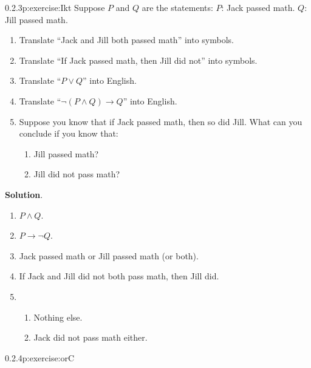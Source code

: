\documentclass[twoside,11pt,]{book}
\newcommand{\blocktitlefont}{\relax}
\numberwithin{equation}{chapter}
\newcommand{\imp}{\rightarrow}
\begin{document}
\begin{divisionsolution}{0.2.3}{}{p:exercise:Ikt}%
Suppose \(P\) and \(Q\) are the statements: \(P\): Jack passed math. \(Q\): Jill passed math.%
\begin{enumerate}[label=(\alph*)]
\item{}Translate ``Jack and Jill both passed math'' into symbols.%
\item{}Translate ``If Jack passed math, then Jill did not'' into symbols.%
\item{}Translate ``\(P \vee Q\)'' into English.%
\item{}Translate ``\(\neg(P \wedge Q) \imp Q\)'' into English.%
\item{}Suppose you know that if Jack passed math, then so did Jill. What can you conclude if you know that:%
\begin{enumerate}[label=\roman*.]
\item{}Jill passed math?%
\item{}Jill did not pass math?%
\end{enumerate}
%
\end{enumerate}
%
\par\smallskip%
\noindent\textbf{\blocktitlefont Solution}.\quad{}%
\begin{enumerate}[label=(\alph*)]
\item{}\(P \wedge Q\).%
\item{}\(P \imp \neg Q\).%
\item{}Jack passed math or Jill passed math (or both).%
\item{}If Jack and Jill did not both pass math, then Jill did.%
\item{}%
\begin{enumerate}[label=\roman*.]
\item{}Nothing else.%
\item{}Jack did not pass math either.%
\end{enumerate}
%
\end{enumerate}
%
\end{divisionsolution}%
\begin{divisionsolution}{0.2.4}{}{p:exercise:orC}%
\end{divisionsolution}%
\end{document}
